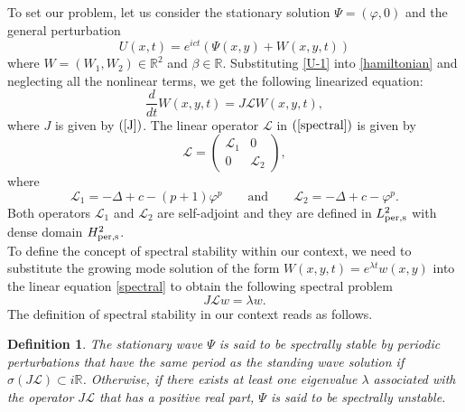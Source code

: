 \documentclass[12pt,reqno,a4paper]{amsart} %
\numberwithin{equation}{section}
\numberwithin{figure}{section}
\newtheorem{definition}[theorem]{Definition}
\begin{document}
		
		
\indent To set our problem, let us consider the stationary solution
$\Psi = (\varphi,0)$ and the general perturbation
\begin{equation}\label{U-1}
	U(x,t) = e^{i c t} (\Psi(x,y) + W(x,y,t))
\end{equation} where $W =(W_1,W_2)\in \mathbb{R}^2$ and $\beta\in\mathbb{R}$. Substituting \eqref{U-1} into \eqref{hamiltonian} and neglecting all the nonlinear terms, we get the following linearized equation:
\begin{equation}\label{spectral}
	\frac{d}{dt} W(x,y,t) = J \mathcal{L} W(x,y,t),
\end{equation}
where $J$ is given by $(\ref{J})$. The linear operator $\mathcal{L}$ in $(\ref{spectral})$ is given by
\begin{equation}\label{matrixop}
 \mathcal{L}= \begin{pmatrix}
\mathcal{L}_1 & 0 \\
0 & \mathcal{L}_2
\end{pmatrix},
\end{equation}
where
\begin{equation}\label{L1L2}
\mathcal{L}_1=-\Delta+c-(p+1)\varphi^p
\qquad \text{and} \qquad
\mathcal{L}_2=-\Delta+c-\varphi^p.
\end{equation}
Both operators $\mathcal{L}_1$ and $\mathcal{L}_2$ are self-adjoint  and they are deﬁned in $L^2_{\rm per,s}$ with dense domain $H^{2}_{\rm per,s}$. \\
\indent To define the concept of spectral stability within our context, we need to substitute the growing mode solution of the form $W(x,y,t)=e^{\lambda t}w(x,y)$ into the linear equation \eqref{spectral} to obtain the following spectral problem
\begin{equation}\label{JL}
	J \mathcal{L} w = \lambda w.
\end{equation} 
\indent The definition of spectral stability in our context reads as follows.
\begin{definition}\label{def-spectralstability}
	The stationary wave $\Psi$ is said to be spectrally stable by periodic perturbations that have the same period as the standing wave solution if $\sigma(J \mathcal{L}) \subset i \mathbb{R}$. Otherwise, if there exists at least one eigenvalue $\lambda$ associated with the operator $J \mathcal{L}$ that has a positive real part, $\Psi$ is said to be spectrally unstable.
\end{definition}
\end{document}
